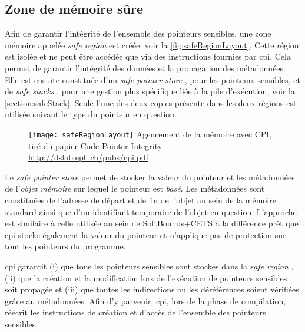 \subsection{Zone de mémoire sûre}

Afin de garantir l'intégrité de l'ensemble des pointeurs sensibles, une zone mémoire appelée \og \textit{safe region} \fg est créée, voir la \autoref{fig:safeRegionLayout}. Cette région est isolée et ne peut être accédée que via des instructions fournies par \gls{cpi}. Cela permet de garantir l'intégrité des données et la propagation des métadonnées. Elle est ensuite constituée d'un \og \textit{safe pointer store} \fg, pour les pointeurs sensibles, et de \og \textit{safe stacks} \fg, pour une gestion plus spécifique liée à la pile d'exécution, voir la \autoref{section:safeStack}. Seule l'une des deux copies présente dans les deux régions est utilisée suivant le type du pointeur en question.

\begin{figure}[H]
	\centering
	\texttt{[image: safeRegionLayout]}
	{Agencement de la mémoire avec CPI, tiré du papier Code-Pointer Integrity}
	{\url{http://dslab.epfl.ch/pubs/cpi.pdf}}
	\label{fig:safeRegionLayout}
\end{figure}

Le \textit{safe pointer store} permet de stocker la valeur du pointeur et les métadonnées de l'\textit{objet mémoire} sur lequel le pointeur est \textit{basé}. Les métadonnées sont constituées de l'adresse de départ et de fin de l'objet au sein de la mémoire standard ainsi que d'un identifiant temporaire de l'objet en question. L'approche est similaire à celle utilisée au sein de SoftBounds+CETS \cite{SoftBound} à la différence prêt que \gls{cpi} stocke également la valeur du pointeur et n'applique pas de protection sur tout les pointeurs du programme.

\gls{cpi} garantit (i) que tous les pointeurs sensibles sont stockés dans la \og \textit{safe region} \fg, (ii) que la création et la modification lors de l'exécution de pointeurs sensibles soit propagée et (iii) que toutes les indirections ou les déréférences soient vérifiées grâce au métadonnées. Afin d'y parvenir, \gls{cpi}, lors de la phase de compilation, réécrit les instructions de création et d'accès de l'ensemble des pointeurs sensibles.


